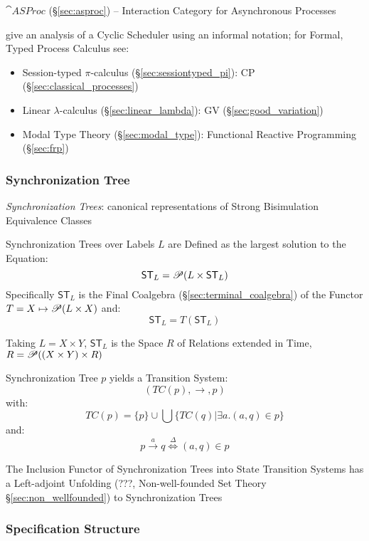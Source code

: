 $\cat{ASProc}$ (\S\ref{sec:asproc}) -- Interaction Category for
Asynchronous Processes

\fist \cite{abramsky-gay-nagarajan96} give an analysis of a Cyclic
Scheduler using an informal notation; for Formal, Typed Process
Calculus see:
\begin{itemize}
  \item Session-typed $\pi$-calculus
    (\S\ref{sec:sessiontyped_pi}): CP
    (\S\ref{sec:classical_processes})
  \item Linear $\lambda$-calculus (\S\ref{sec:linear_lambda}): GV
    (\S\ref{sec:good_variation})
  \item Modal Type Theory (\S\ref{sec:modal_type}): Functional
    Reactive Programming (\S\ref{sec:frp})
\end{itemize}



\subsubsection{Synchronization Tree}\label{sec:synchronization_tree}

\emph{Synchronization Trees}: canonical representations of Strong
Bisimulation Equivalence Classes

Synchronization Trees over Labels $L$ are Defined as the largest
solution to the Equation:
\[
  \mathsf{ST}_L = \mathscr{P}(L \times \mathsf{ST}_L)
\]
Specifically $\mathsf{ST}_L$ is the Final Coalgebra
(\S\ref{sec:terminal_coalgebra}) of the Functor $T = X \mapsto \mathscr{P}(L
\times X)$ and:
\[
  \mathsf{ST}_L = T(\mathsf{ST}_L)
\]

Taking $L = X \times Y$, $\mathsf{ST}_L$ is the Space $R$ of Relations
extended in Time, $R = \mathscr{P}((X \times Y) \times R)$

Synchronization Tree $p$ yields a Transition System:
\[
  (TC(p), \rightarrow, p)
\]
with:
\[
  TC(p) = \{p\} \cup \bigcup\{TC(q) | \exists a.(a,q) \in p\}
\]
and:
\[
  p \xrightarrow{a} q \stackrel{\Delta}\Longleftrightarrow (a,q) \in p
\]

The Inclusion Functor of Synchronization Trees into State Transition
Systems has a Left-adjoint Unfolding (???, Non-well-founded Set Theory
\S\ref{sec:non_wellfounded}) to Synchronization Trees



\subsubsection{Specification Structure}
\label{sec:specification_structure}
\cite{abramsky-gay-nagarajan96}

